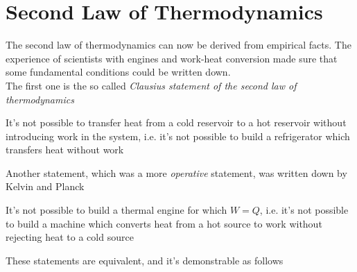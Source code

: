 \documentclass[../qm.tex]{subfiles}
\begin{document}
\section{Second Law of Thermodynamics}
The second law of thermodynamics can now be derived from empirical facts. The experience of scientists with engines and work-heat conversion made sure that some fundamental conditions could be written down.\\
The first one is the so called \textit{Clausius statement of the second law of thermodynamics}
\begin{thm}
	It's not possible to transfer heat from a cold reservoir to a hot reservoir without introducing work in the system, i.e. it's not possible to build a refrigerator which transfers heat without work
\end{thm}
Another statement, which was a more \textit{operative} statement, was written down by Kelvin and Planck
\begin{thm}
	It's not possible to build a thermal engine for which $W=Q$, i.e. it's not possible to build a machine which converts heat from a hot source to work without rejecting heat to a cold source
\end{thm}
These statements are equivalent, and it's demonstrable as follows
\end{document}
